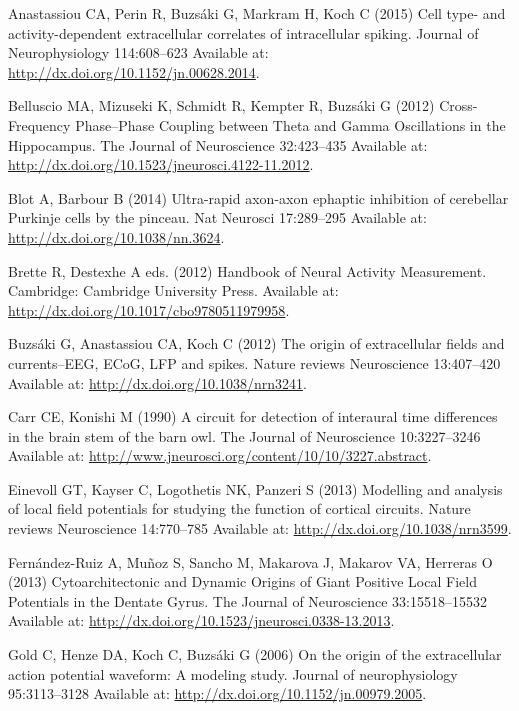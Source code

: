 \documentclass[]{article}
\begin{document}
\hypertarget{refs}{}
\hypertarget{ref-Anastassiou2015Cell}{}
Anastassiou CA, Perin R, Buzsáki G, Markram H, Koch C (2015) Cell type-
and activity-dependent extracellular correlates of intracellular
spiking. Journal of Neurophysiology 114:608--623 Available at:
\url{http://dx.doi.org/10.1152/jn.00628.2014}.

\hypertarget{ref-Belluscio2012CrossFrequency}{}
Belluscio MA, Mizuseki K, Schmidt R, Kempter R, Buzsáki G (2012)
Cross-Frequency Phase--Phase Coupling between Theta and Gamma
Oscillations in the Hippocampus. The Journal of Neuroscience 32:423--435
Available at: \url{http://dx.doi.org/10.1523/jneurosci.4122-11.2012}.

\hypertarget{ref-Blot2014Ultrarapid}{}
Blot A, Barbour B (2014) Ultra-rapid axon-axon ephaptic inhibition of
cerebellar Purkinje cells by the pinceau. Nat Neurosci 17:289--295
Available at: \url{http://dx.doi.org/10.1038/nn.3624}.

\hypertarget{ref-Brette2012Handbook}{}
Brette R, Destexhe A eds. (2012) Handbook of Neural Activity
Measurement. Cambridge: Cambridge University Press. Available at:
\url{http://dx.doi.org/10.1017/cbo9780511979958}.

\hypertarget{ref-Buzsaki2012Origin}{}
Buzsáki G, Anastassiou CA, Koch C (2012) The origin of extracellular
fields and currents--EEG, ECoG, LFP and spikes. Nature reviews
Neuroscience 13:407--420 Available at:
\url{http://dx.doi.org/10.1038/nrn3241}.

\hypertarget{ref-carr90}{}
Carr CE, Konishi M (1990) A circuit for detection of interaural time
differences in the brain stem of the barn owl. The Journal of
Neuroscience 10:3227--3246 Available at:
\url{http://www.jneurosci.org/content/10/10/3227.abstract}.

\hypertarget{ref-Einevoll2013Modelling}{}
Einevoll GT, Kayser C, Logothetis NK, Panzeri S (2013) Modelling and
analysis of local field potentials for studying the function of cortical
circuits. Nature reviews Neuroscience 14:770--785 Available at:
\url{http://dx.doi.org/10.1038/nrn3599}.

\hypertarget{ref-FernandezRuiz2013Cytoarchitectonic}{}
Fernández-Ruiz A, Muñoz S, Sancho M, Makarova J, Makarov VA, Herreras O
(2013) Cytoarchitectonic and Dynamic Origins of Giant Positive Local
Field Potentials in the Dentate Gyrus. The Journal of Neuroscience
33:15518--15532 Available at:
\url{http://dx.doi.org/10.1523/jneurosci.0338-13.2013}.

\hypertarget{ref-Gold2006Origin}{}
Gold C, Henze DA, Koch C, Buzsáki G (2006) On the origin of the
extracellular action potential waveform: A modeling study. Journal of
neurophysiology 95:3113--3128 Available at:
\url{http://dx.doi.org/10.1152/jn.00979.2005}.
\end{document}
